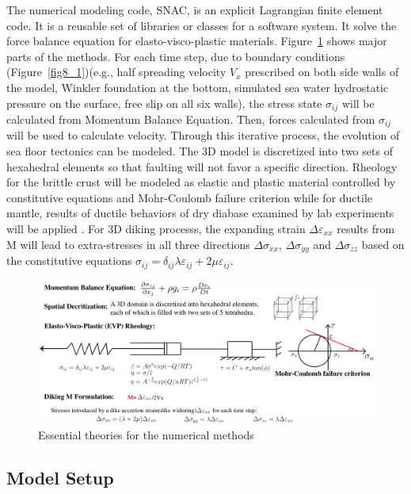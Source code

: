 \documentclass[12pt]{article}
\begin{document}
The numerical modeling code, SNAC, is an explicit Lagrangian finite element code. It is a reusable set of libraries or classes for a software system. It  solve the force balance equation for elasto-visco-plastic materials. Figure~\ref{fig7_1} shows major parts of the methods. For each time step, due to boundary conditions (Figure~\ref{fig8_1})(e.g., half spreading velocity $V_{x}$ prescribed on both side walls of the model, Winkler foundation at the bottom, simulated sea water hydrostatic pressure on the surface, free slip on all six walls), the stress state $\sigma_{ij}$ will be calculated from Momentum Balance Equation. Then, forces calculated from $\sigma_{ij}$ will be used to calculate velocity. Through this iterative process, the evolution of sea floor tectonics can be modeled. The 3D model is discretized into two sets of hexahedral elements so that faulting will not favor a specific direction. Rheology for the brittle crust will be modeled as elastic and plastic material controlled by constitutive equations and Mohr-Coulomb failure criterion while for ductile mantle, results of ductile behaviors of dry diabase examined by lab experiments will be applied \citep{Kirby1987}. For 3D diking processs, the expanding strain $\Delta\varepsilon_{xx}$ results from M will lead to extra-stresses in all three directions $\Delta\sigma_{xx}$, $\Delta\sigma_{yy}$ and $\Delta\sigma_{zz}$ based on the constitutive equations $\sigma_{ij}=\delta_{ij}\lambda\varepsilon_{ij}+2\mu\varepsilon_{ij}$.

\begin{figure}[H]
 \centering
  \includegraphics[scale=0.46]{fig7_1.png}
 \caption{\small{Essential theories for the numerical methods}}
 \label{fig7_1}
\end{figure}

\subsection{Model Setup}
\end{document}
